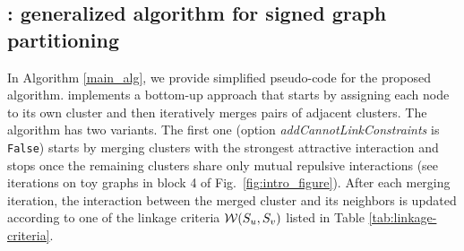 


\subsection{\algname{}: generalized algorithm for signed graph partitioning} \label{sec:algorithm} 

In Algorithm \ref{main_alg}, we provide simplified pseudo-code for the proposed \algname{} algorithm. \algname{} implements a bottom-up approach that starts by assigning each node to its own cluster and then iteratively merges pairs of adjacent clusters. The algorithm has two variants. The first one (option \emph{addCannotLinkConstraints} is \texttt{False}) starts by merging clusters with the strongest attractive interaction and stops once the remaining clusters share only mutual repulsive interactions (see iterations on toy graphs in block 4 of Fig.\ \hyperref[fig:intro_figure]{\ref*{fig:intro_figure}}). After each merging iteration, the interaction between the merged cluster and its neighbors is updated according to one of the linkage criteria $\mathcal{W}(S_u, S_v)$ listed in Table \ref{tab:linkage-criteria}.

